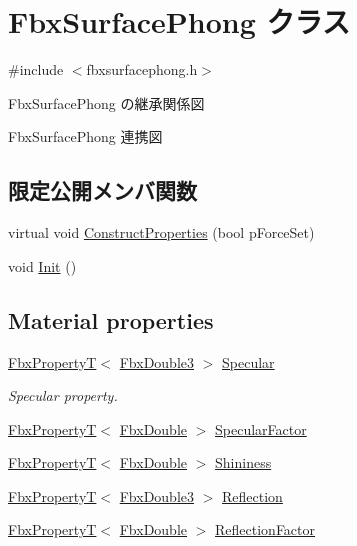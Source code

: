 \hypertarget{class_fbx_surface_phong}{}\section{Fbx\+Surface\+Phong クラス}
\label{class_fbx_surface_phong}


{\ttfamily \#include $<$fbxsurfacephong.\+h$>$}



Fbx\+Surface\+Phong の継承関係図


Fbx\+Surface\+Phong 連携図
\subsection*{限定公開メンバ関数}
\begin{DoxyCompactItemize}
\item 
virtual void \hyperlink{class_fbx_surface_phong_aa4262a042d35769e8ff745d408315bf9}{Construct\+Properties} (bool p\+Force\+Set)
\item 
void \hyperlink{class_fbx_surface_phong_af594d25056c03cd67396191c7d480098}{Init} ()
\end{DoxyCompactItemize}
\subsection*{Material properties}
\begin{DoxyCompactItemize}
\item 
\hyperlink{class_fbx_property_t}{Fbx\+PropertyT}$<$ \hyperlink{fbxtypes_8h_ae0a96f14cde566774c7553aa7523b7a7}{Fbx\+Double3} $>$ \hyperlink{class_fbx_surface_phong_a2f845bd60215d282c415e2129034e79e}{Specular}
\begin{DoxyCompactList}\small\item\em Specular property. \end{DoxyCompactList}\item 
\hyperlink{class_fbx_property_t}{Fbx\+PropertyT}$<$ \hyperlink{fbxtypes_8h_a171e72a1c46fc15c1a6c9c31948c1c5b}{Fbx\+Double} $>$ \hyperlink{class_fbx_surface_phong_a821efe9075d1d6ee22d3ab72ab303eaa}{Specular\+Factor}
\item 
\hyperlink{class_fbx_property_t}{Fbx\+PropertyT}$<$ \hyperlink{fbxtypes_8h_a171e72a1c46fc15c1a6c9c31948c1c5b}{Fbx\+Double} $>$ \hyperlink{class_fbx_surface_phong_ae92be9749116e7eedecb2447b6401d7d}{Shininess}
\item 
\hyperlink{class_fbx_property_t}{Fbx\+PropertyT}$<$ \hyperlink{fbxtypes_8h_ae0a96f14cde566774c7553aa7523b7a7}{Fbx\+Double3} $>$ \hyperlink{class_fbx_surface_phong_a67159f889406ad672d13e463e840a9ba}{Reflection}
\item 
\hyperlink{class_fbx_property_t}{Fbx\+PropertyT}$<$ \hyperlink{fbxtypes_8h_a171e72a1c46fc15c1a6c9c31948c1c5b}{Fbx\+Double} $>$ \hyperlink{class_fbx_surface_phong_a87608ae7193bbac4f63c97f6c5f1dee2}{Reflection\+Factor}
\end{DoxyCompactItemize}
